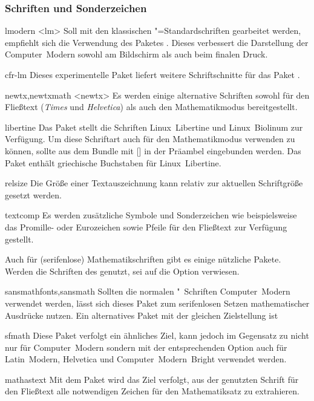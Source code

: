 \subsubsection{Schriften und Sonderzeichen}
\begin{packages}
\item[lmodern]<lm>
  Soll mit den klassischen "=Standardschriften gearbeitet werden, 
  empfiehlt sich die Verwendung des Paketes . Dieses 
  verbessert die Darstellung der Computer~Modern sowohl am Bildschirm als auch 
  beim finalen Druck.
\item[cfr-lm]
  Dieses experimentelle Paket liefert weitere Schriftschnitte für das Paket 
  .
\item[newtx,newtxmath]<newtx>
  Es werden einige alternative Schriften sowohl für den Fließtext 
  (\textit{Times} und \textit{Helvetica}) als auch den Mathematikmodus 
  bereitgestellt.
\item[libertine]
  Das Paket stellt die Schriften Linux~Libertine und Linux~Biolinum zur 
  Verfügung. Um diese Schriftart auch für den Mathematikmodus verwenden zu 
  können, sollte  aus dem Bundle  mit 
  [] in der 
  Präambel eingebunden werden. Das Paket  enthält griechische 
  Buchstaben für Linux~Libertine.
\item[relsize]
  Die Größe einer Textauszeichnung kann relativ zur aktuellen Schriftgröße 
  gesetzt werden.
\item[textcomp]
  Es werden zusätzliche Symbole und Sonderzeichen wie beispielsweise das 
  Promille- oder Eurozeichen sowie Pfeile für den Fließtext zur Verfügung 
  gestellt.
\end{packages}
%
%
Auch für (serifenlose) Mathematikschriften gibt es einige nützliche Pakete. 
Werden die Schriften des \CDs genutzt, sei auf die Option  
verwiesen.
%
\begin{packages}
\item[sansmathfonts,sansmath]
  Sollten die normalen "~Schriften Computer~Modern verwendet 
  werden, lässt sich dieses Paket zum serifenlosen Setzen mathematischer 
  Ausdrücke nutzen. Ein alternatives Paket mit der gleichen Zielstellung ist 
\item[sfmath]
  Diese Paket verfolgt ein ähnliches Ziel, kann jedoch im Gegensatz zu 
   nicht nur für Computer~Modern sondern mit der 
  entsprechenden Option auch für Latin~Modern, Helvetica und 
  Computer~Modern~Bright verwendet werden.
\item[mathastext]
  Mit dem Paket wird das Ziel verfolgt, aus der genutzten Schrift für den 
  Fließtext alle notwendigen Zeichen für den Mathematiksatz zu extrahieren.
\end{packages}


